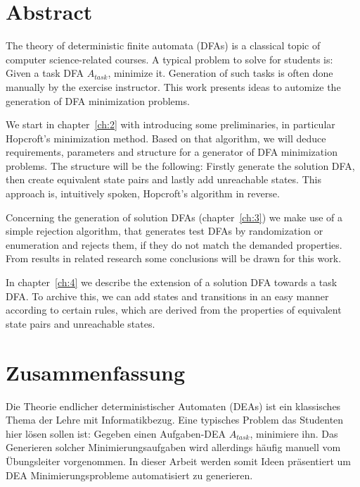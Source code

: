 
\chapter{Abstract}


The theory of deterministic finite automata (DFAs) is a classical topic of computer science-related courses. A typical problem to solve for students is: Given a task DFA $A_{task}$, minimize it. Generation of such tasks is often done manually by the exercise instructor. This work presents ideas to automize the generation of DFA minimization problems.


We start in chapter~\ref{ch:2} with introducing some preliminaries, in particular Hopcroft's minimization method. Based on that algorithm, we will deduce requirements, parameters and structure for a generator of DFA minimization problems. The structure will be the following: Firstly generate the solution DFA, then create equivalent state pairs and lastly add unreachable states. This approach is, intuitively spoken, Hopcroft's algorithm in reverse.


Concerning the generation of solution DFAs (chapter~\ref{ch:3}) we make use of a simple rejection algorithm, that generates test DFAs by randomization or enumeration and rejects them, if they do not match the demanded properties. From results in related research some conclusions will be drawn for this work.


In chapter~\ref{ch:4} we describe the extension of a solution DFA towards a task DFA. To archive this, we can add states and transitions in an easy manner according to certain rules, which are derived from the properties of equivalent state pairs and unreachable states. 



\chapter{Zusammenfassung}

Die Theorie endlicher deterministischer Automaten (DEAs) ist ein klassisches Thema der Lehre mit Informatikbezug. Eine typisches Problem das Studenten hier lösen sollen ist: Gegeben einen Aufgaben-DEA $A_{task}$, minimiere ihn. Das Generieren solcher Minimierungsaufgaben wird allerdings häufig manuell vom Übungsleiter vorgenommen. In dieser Arbeit werden somit Ideen präsentiert um DEA Minimierungsprobleme automatisiert zu generieren.


